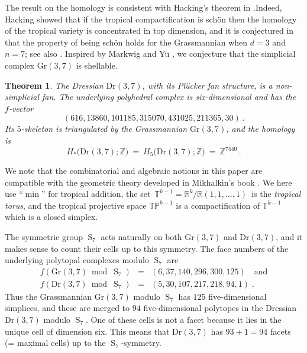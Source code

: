 \documentclass[12pt,a4paper]{amsart}
\newtheorem{thm}{Theorem}[section]
\theoremstyle{definition}
\newcommand{\R}{{\mathbb{R}}}
\newcommand{\Z}{{\mathbb{Z}}}
\newcommand{\Gr}{{\mathrm{Gr}}}
\newcommand{\Dr}{{\mathrm{Dr}}}
\newcommand{\TA}{{\mathbb{T}}}
\newcommand{\TP}{{\mathbb{TP}}}
\providecommand{\Sym}{\operatorname{S}}
\begin{document}
The result on the homology is consistent with Hacking's theorem in
\cite[Theorem~2.5]{Hac}.Indeed, Hacking showed that if the tropical
compactification is sch\"on then the homology of the tropical variety is
concentrated in top dimension, and it is conjectured in \cite[\S1.4]{KT} that
the property of being sch\"on holds for the Grassmannian when $d=3$ and $n=7$;
see also \cite[Example 4.2]{Hac}.  Inspired by Markwig and Yu \cite{MY}, we
conjecture that the simplicial complex $\Gr(3,7)$ is shellable.


\begin{thm}
  \label{thm:Dr37}
  The Dressian $\Dr(3,7)$, with its Pl\"ucker fan structure, is a
  non-simplicial fan. The underlying polyhedral complex is
  six-dimensional and has the $f$-vector
  \[
  (616, 13860, 101185, 315070, 431025, 211365, 30) \, .
  \]
  Its $5$-skeleton is triangulated by the Grassmannian $\Gr(3,7)$, and
  the homology is
  \[
  H_*\bigl( \Dr(3,7); \Z \bigr) \ = \ H_5\bigl( \Dr(3,7); \Z \bigr)
  \ = \ \Z^{7440} \, .
  \]
\end{thm}

We note that the combinatorial and algebraic notions in this paper are
compatible with the geometric theory developed in Mikhalkin's book
\cite{Mik}. We here use ``$\min$'' for tropical addition, the set
$\,\TA^{k-1}=\R^k/\R(1,1,\dots,1)\,$ is the \emph{tropical torus}, and
the tropical projective space $\TP^{k-1}$ is a compactification of
$\TA^{k-1}$ which is a closed simplex.

The symmetric group $\Sym_7$ acts naturally on both $\Gr(3,7)$ and
$\Dr(3,7)$, and it makes sense to count their cells up to this
symmetry.  The face numbers of the underlying polytopal complexes
modulo $\Sym_7$ are
\begin{eqnarray*}
f(\Gr(3,7) \bmod \Sym_7) &  = & (6,37,140,296,300,125)\quad \text{and} \\
f(\Dr(3,7) \bmod \Sym_7) &  = & (5,30,107,217,218,94,1)\;.
\end{eqnarray*}
Thus the Grassmannian $\Gr(3,7)$ modulo $\Sym_7$ has $125 $
five-dimensional simplices, and these are merged to $94$
five-dimensional polytopes in the Dressian $\Dr(3,7)$ modulo $\Sym_7$.
One of these cells is not a facet because it lies in the unique cell
of dimension six. This means that $\Dr(3,7)$ has $93 + 1 = 94$ facets
(= maximal cells) up to the $\Sym_7$-symmetry.
\end{document}
